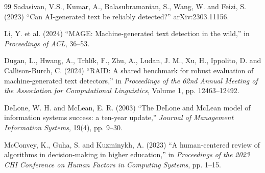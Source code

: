 \documentclass[11pt,a4paper]{article}
\begin{document}
\begin{thebibliography}{99}
 Sadasivan, V.S., Kumar, A., Balasubramanian, S.,
Wang, W. and Feizi, S. (2023) ``Can AI-generated text be reliably
detected?'' arXiv:2303.11156.

 Li, Y. et al. (2024) ``MAGE: Machine-generated text
detection in the wild,'' in \emph{Proceedings of ACL}, 36--53.

 Dugan, L., Hwang, A., Trhl{\'i}k, F., Zhu, A., Ludan,
J. M., Xu, H., Ippolito, D. and Callison-Burch, C. (2024) ``RAID: A shared
benchmark for robust evaluation of machine-generated text detectors,'' in
\emph{Proceedings of the 62nd Annual Meeting of the Association for
Computational Linguistics}, Volume 1, pp. 12463--12492.

 DeLone, W. H. and McLean, E. R. (2003) ``The DeLone
and McLean model of information systems success: a ten-year update,''
\emph{Journal of Management Information Systems}, 19(4), pp. 9--30.

 McConvey, K., Guha, S. and Kuzminykh, A. (2023) ``A
human-centered review of algorithms in decision-making in higher
education,'' in \emph{Proceedings of the 2023 CHI Conference on Human
Factors in Computing Systems}, pp. 1--15.

\end{thebibliography}
\end{document}
